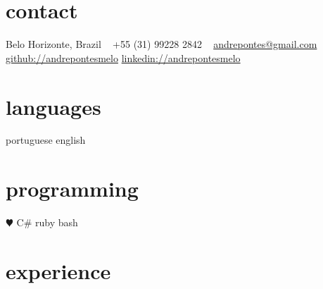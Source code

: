 \documentclass[]{friggeri-cv-a4}
\begin{document}


\begin{aside} %
\section{contact}
Belo Horizonte, Brazil
~
+55 (31) 99228 2842
~
\href{mailto:andrepontes@gmail.com}{andrepontes@gmail.com}
\href{http://github.com/andrepontesmelo}{github://andrepontesmelo}
\href{http://linkedin.com/in/andrepontesmelo}{linkedin://andrepontesmelo}
\section{languages}
portuguese 
english
\section{programming}
{\color{red} $\varheartsuit$} C\#
ruby
bash
\end{aside}


\section{experience}
\end{document}
